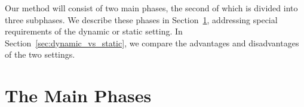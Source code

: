 Our method will consist of two main phases, the second of which is divided
into three subphases.
We describe these phases in Section~\ref{sec:phases},
addressing special requirements of the dynamic or static setting.
In Section~\ref{sec:dynamic_vs_static}, we compare the 
advantages and disadvantages of the two settings.

\section{The Main Phases}
\label{sec:phases}

\newlength{\mainphases}%
\newlength{\subphases}\settowidth{\subphases}{\fns Answer Presentation~}%
